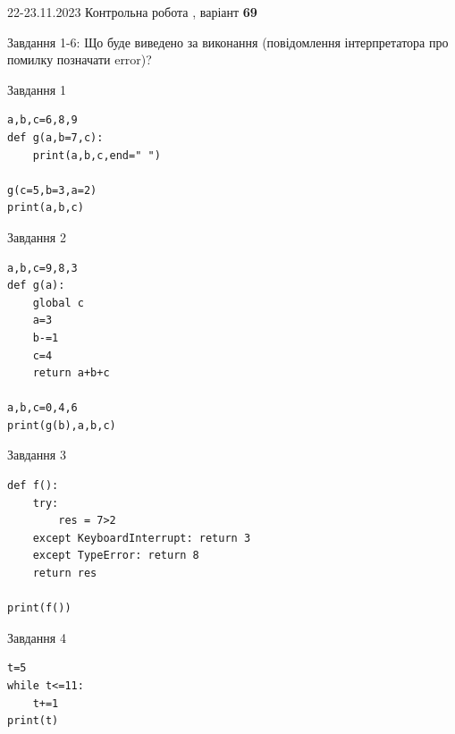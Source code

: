 \documentclass[12pt, ukrainian]{article}
\begin{document}
{{22-23.11.2023 Контрольна робота , варіант  \No \textbf { 69 }\par}}
{

Завдання 1-6: Що буде виведено за виконання (повідомлення інтерпретатора про помилку позначати error)?


\begin{minipage}[t]{9.7cm}                
{\begin{center}Завдання {1}\end{center}}
\begin{verbatim}
a,b,c=6,8,9
def g(a,b=7,c):
    print(a,b,c,end=" ")

g(c=5,b=3,a=2)
print(a,b,c)
\end{verbatim}     
\end{minipage}
\vline \hspace{8mm}
\begin{minipage}[t]{8.0cm}                
{\begin{center}Завдання {2}\end{center}}
\begin{verbatim}
a,b,c=9,8,3
def g(a):
    global c
    a=3
    b-=1
    c=4
    return a+b+c

a,b,c=0,4,6
print(g(b),a,b,c)
\end{verbatim}     
\end{minipage}

\vspace{15mm}
\begin{minipage}[t]{9.7cm}                
{\begin{center}Завдання {3}\end{center}}
\begin{verbatim}
def f():
    try:
        res = 7>2
    except KeyboardInterrupt: return 3
    except TypeError: return 8
    return res

print(f())
\end{verbatim}     
\end{minipage}
\vline \hspace{8mm}
\begin{minipage}[t]{8.0cm}                
{\begin{center}Завдання {4}\end{center}}
\begin{verbatim}
t=5
while t<=11:
    t+=1
print(t)
\end{verbatim}     
\end{minipage}

}
\end{document}
